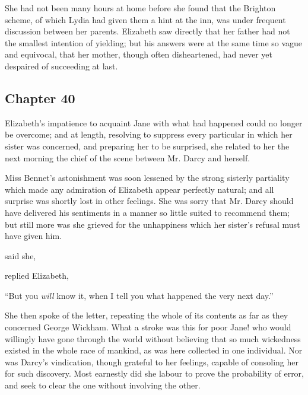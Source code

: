 She had not been many hours at home before she found that the Brighton scheme, of which Lydia had given them a hint at the inn, was under frequent discussion between her parents. Elizabeth saw directly that her father had not the smallest intention of yielding; but his answers were at the same time so vague and equivocal, that her mother, though often disheartened, had never yet despaired of succeeding at last.

\subsection[chapter-40]{\useURL[url40][][][]\from[url40] Chapter 40}

Elizabeth's impatience to acquaint Jane with what had happened could no longer be overcome; and at length, resolving to suppress every particular in which her sister was concerned, and preparing her to be surprised, she related to her the next morning the chief of the scene between Mr. Darcy and herself.

Miss Bennet's astonishment was soon lessened by the strong sisterly partiality which made any admiration of Elizabeth appear perfectly natural; and all surprise was shortly lost in other feelings. She was sorry that Mr. Darcy should have delivered his sentiments in a manner so little suited to recommend them; but still more was she grieved for the unhappiness which her sister's refusal must have given him.

 said she, 

 replied Elizabeth, 




“But you {\em will} know it, when I tell you what happened the very next day.”

She then spoke of the letter, repeating the whole of its contents as far as they concerned George Wickham. What a stroke was this for poor Jane! who would willingly have gone through the world without believing that so much wickedness existed in the whole race of mankind, as was here collected in one individual. Nor was Darcy's vindication, though grateful to her feelings, capable of consoling her for such discovery. Most earnestly did she labour to prove the probability of error, and seek to clear the one without involving the other.

